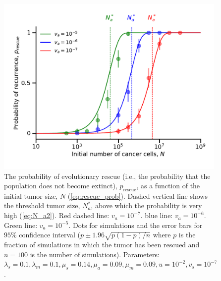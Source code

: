 \documentclass[12pt]{extarticle}
\newcommand{\presc}{p_\text{rescue}}
\begin{document}
\begin{appendices}
\begin{figure}
\includegraphics[width=1\textwidth]{Figures/ProbvNPlot_ane.pdf}
\caption{The probability of evolutionary rescue (i.e., the probability that the population does not become extinct), $\presc$, as a function of the initial tumor size, $N$ (\cref{eq:rescue_prob}). Dashed vertical line shows the threshold tumor size, $N_a^*$, above which the probability is very high (\cref{eq:N_a2}). Red dashed line: $v_a=10^{-7}$. blue line: $v_a=10^{-6}$. Green line: $v_a=10^{-5}$. Dots for simulations and the error bars for $95\%$ confidence interval ($p\pm1.96\sqrt{p\left(1-p\right)/n}$ where $p$ is the fraction of simulations in which the tumor has been rescued and $n=100$ is the number of simulations). Parameters: $\lambda_s=0.1,\lambda_m=0.1,\mu_s=0.14,\mu_a=0.09,\mu_m=0.09, u=10^{-2}, v_s=10^{-7}$.}
\label{rescue_prob_ane}
\end{figure}
\end{appendices}
\end{document}
